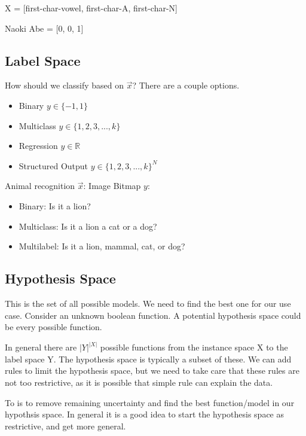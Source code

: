 \begin{example}
    
    X = [first-char-vowel, first-char-A, first-char-N]

    Naoki Abe = [0, 0, 1]
\end{example}

\subsection{Label Space}
How should we classify based on $\vec{x}$? There are a couple options.
\begin{itemize}
    \item Binary $y \in \{-1, 1\}$
    \item Multiclass $y \in \{1, 2, 3, ..., k\}$
    \item Regression $y \in \mathbb{R}$ 
    \item Structured Output $y \in \{1, 2, 3, ..., k\}^N$
\end{itemize}
\begin{example}
    Animal recognition
    $\vec{x}$: Image Bitmap
    $y$:
    \begin{itemize}
        \item Binary: Is it a lion?
        \item Multiclass: Is it a lion a cat or a dog?
        \item Multilabel: Is it a lion, mammal, cat, or dog?
    \end{itemize}
\end{example}

\subsection{Hypothesis Space}
This is the set of all possible models. We need to find the best one for our use case. Consider an unknown boolean function. A potential hypothesis space could be every possible function.

In general there are $|Y|^|X|$ possible functions from the instance space X to the label space Y. The hypothesis space is typically a subset of these. We can add rules to limit the hypothesis space, but we need to take care that these rules are not too restrictive, as it is possible that  simple rule can explain the data.

To  is to remove remaining uncertainty and find the best function/model in our hypothsis space. In general it is a good idea to start the hypothesis space as restrictive, and get more general.


